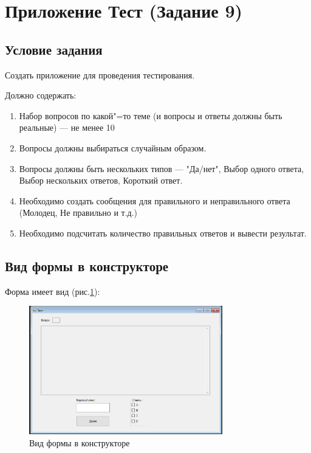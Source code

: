 \section{Приложение Тест (Задание 9)}

\subsection{Условие задания}

Создать приложение для проведения тестирования.

Должно содержать:


\begin{enumerate}
    \item{Набор вопросов по какой"=то теме (и вопросы и ответы должны быть реальные) --- не менее 10}
    \item{Вопросы должны выбираться случайным образом.}
    \item{Вопросы должны быть нескольких типов --- "Да/нет", Выбор одного ответа, Выбор нескольких ответов, Короткий ответ.}
    \item{Необходимо создать сообщения для правильного и неправильного ответа (Молодец, Не правильно и т.д.)}
    \item{Необходимо подсчитать количество правильных ответов и вывести результат.}
\end{enumerate}

\subsection{Вид формы в конструкторе}

Форма имеет вид (рис.\ref{fig:FormInConstruct9}):

\begin{figure}[!h]
    \centering
    \includegraphics[width = 0.75\textwidth]{images/Task9/FormInConstructor.png}
    \caption{Вид формы в конструкторе}
    \label{fig:FormInConstruct9}
\end{figure}

